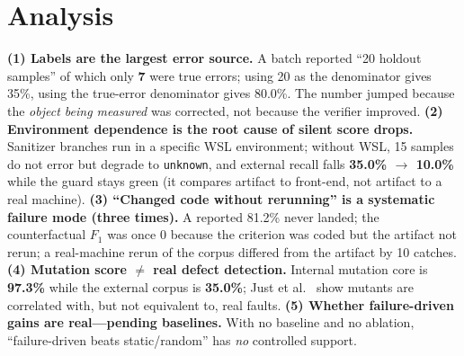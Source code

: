 \documentclass{article}
\begin{document}
\section{Analysis}
\label{sec:analysis}
\textbf{(1) Labels are the largest error source.} A batch reported ``20 holdout samples'' of which
only \textbf{7} were true errors; using 20 as the denominator gives 35\%, using the true-error
denominator gives 80.0\%. The number jumped because the \emph{object being measured} was corrected,
not because the verifier improved.
\textbf{(2) Environment dependence is the root cause of silent score drops.} Sanitizer branches run
in a specific WSL environment; without WSL, 15 samples do not error but degrade to
\texttt{unknown}, and external recall falls \textbf{35.0\% $\to$ 10.0\%} while the guard stays green
(it compares artifact to front-end, not artifact to a real machine).
\textbf{(3) ``Changed code without rerunning'' is a systematic failure mode (three times).} A
reported 81.2\% never landed; the counterfactual $F_1$ was once 0 because the criterion was coded
but the artifact not rerun; a real-machine rerun of the corpus differed from the artifact by 10
catches.
\textbf{(4) Mutation score $\neq$ real defect detection.} Internal mutation core is \textbf{97.3\%}
while the external corpus is \textbf{35.0\%}; Just et al.~\cite{just2014mutants} show mutants are
correlated with, but not equivalent to, real faults.
\textbf{(5) Whether failure-driven gains are real---pending baselines.} With no baseline and no
ablation, ``failure-driven beats static/random'' has \emph{no} controlled support.

\end{document}
